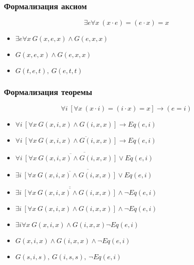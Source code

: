 \documentclass[24pt,pdf,hyperref={unicode}]{beamer}
\begin{document}
\begin{frame}\frametitle{Формализация аксиом}
$$
\exists e\forall x\ (x\cdot e)=(e\cdot x)=x
$$
\begin{itemize}
\item<+-> $\exists e\forall x\ G(x,e,x)\wedge G(e,x,x)$
\item<+-> $G(x,e,x)\wedge G(e,x,x)$
\item<+-> $G(t,e,t),\ G(e,t,t)$
\end{itemize}
\end{frame}

\begin{frame}\frametitle{Формализация теоремы}
$$
\forall i\ \left[\forall x\ (x\cdot i)=(i\cdot x)=x\right]\rightarrow (e=i)
$$
\begin{itemize}
\item<+-> $\forall i\ \left[\forall x\ G(x,i,x)\wedge G(i,x,x) \right]\rightarrow Eq(e,i)$
\item<+-> $\overline{\forall i\ \left[\forall x\ G(x,i,x)\wedge G(i,x,x) \right]\rightarrow Eq(e,i)}$
\item<+-> $\overline{\forall i\ \overline{\left[\forall x\ G(x,i,x)\wedge G(i,x,x) \right]}\vee Eq(e,i)}$
\item<+-> $\exists i\ \overline{\overline{\left[\forall x\ G(x,i,x)\wedge G(i,x,x) \right]}\vee Eq(e,i)}$
\item<+-> $\exists i\ \overline{\overline{\left[\forall x\ G(x,i,x)\wedge G(i,x,x) \right]}}\wedge \neg Eq(e,i)$
\item<+-> $\exists i\ \left[\forall x\ G(x,i,x)\wedge G(i,x,x) \right]\wedge \neg Eq(e,i)$
\item<+-> $\exists i\forall x\  G(x,i,x)\wedge G(i,x,x) \neg Eq(e,i)$
\item<+-> $G(x,i,x)\wedge G(i,x,x) \wedge \neg Eq(e,i)$
\item<+-> $G(s,i,s),\ G(i,s,s),\ \neg Eq(e,i)$
\end{itemize}
\end{frame}
\end{document}
